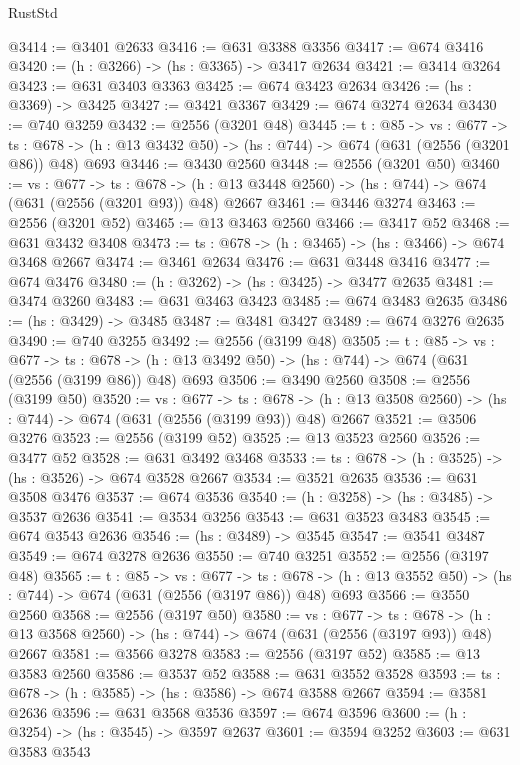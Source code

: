 \begin{lexlean}{RustStd}
\begin{coremodule}
@3414 := @3401 @2633
@3416 := @631 @3388 @3356
@3417 := @674 @3416
@3420 := (h : @3266) -> (hs : @3365) -> @3417 @2634
@3421 := @3414 @3264
@3423 := @631 @3403 @3363
@3425 := @674 @3423 @2634
@3426 := (hs : @3369) -> @3425
@3427 := @3421 @3367
@3429 := @674 @3274 @2634
@3430 := @740 @3259
@3432 := @2556 (@3201 @48)
@3445 := {t : @85} ->
  {vs : @677} ->
  {ts : @678} -> (h : @13 @3432 @50) -> (hs : @744) -> @674 (@631 (@2556 (@3201 @86)) @48) @693
@3446 := @3430 @2560
@3448 := @2556 (@3201 @50)
@3460 := {vs : @677} ->
  {ts : @678} -> (h : @13 @3448 @2560) -> (hs : @744) -> @674 (@631 (@2556 (@3201 @93)) @48) @2667
@3461 := @3446 @3274
@3463 := @2556 (@3201 @52)
@3465 := @13 @3463 @2560
@3466 := @3417 @52
@3468 := @631 @3432 @3408
@3473 := {ts : @678} -> (h : @3465) -> (hs : @3466) -> @674 @3468 @2667
@3474 := @3461 @2634
@3476 := @631 @3448 @3416
@3477 := @674 @3476
@3480 := (h : @3262) -> (hs : @3425) -> @3477 @2635
@3481 := @3474 @3260
@3483 := @631 @3463 @3423
@3485 := @674 @3483 @2635
@3486 := (hs : @3429) -> @3485
@3487 := @3481 @3427
@3489 := @674 @3276 @2635
@3490 := @740 @3255
@3492 := @2556 (@3199 @48)
@3505 := {t : @85} ->
  {vs : @677} ->
  {ts : @678} -> (h : @13 @3492 @50) -> (hs : @744) -> @674 (@631 (@2556 (@3199 @86)) @48) @693
@3506 := @3490 @2560
@3508 := @2556 (@3199 @50)
@3520 := {vs : @677} ->
  {ts : @678} -> (h : @13 @3508 @2560) -> (hs : @744) -> @674 (@631 (@2556 (@3199 @93)) @48) @2667
@3521 := @3506 @3276
@3523 := @2556 (@3199 @52)
@3525 := @13 @3523 @2560
@3526 := @3477 @52
@3528 := @631 @3492 @3468
@3533 := {ts : @678} -> (h : @3525) -> (hs : @3526) -> @674 @3528 @2667
@3534 := @3521 @2635
@3536 := @631 @3508 @3476
@3537 := @674 @3536
@3540 := (h : @3258) -> (hs : @3485) -> @3537 @2636
@3541 := @3534 @3256
@3543 := @631 @3523 @3483
@3545 := @674 @3543 @2636
@3546 := (hs : @3489) -> @3545
@3547 := @3541 @3487
@3549 := @674 @3278 @2636
@3550 := @740 @3251
@3552 := @2556 (@3197 @48)
@3565 := {t : @85} ->
  {vs : @677} ->
  {ts : @678} -> (h : @13 @3552 @50) -> (hs : @744) -> @674 (@631 (@2556 (@3197 @86)) @48) @693
@3566 := @3550 @2560
@3568 := @2556 (@3197 @50)
@3580 := {vs : @677} ->
  {ts : @678} -> (h : @13 @3568 @2560) -> (hs : @744) -> @674 (@631 (@2556 (@3197 @93)) @48) @2667
@3581 := @3566 @3278
@3583 := @2556 (@3197 @52)
@3585 := @13 @3583 @2560
@3586 := @3537 @52
@3588 := @631 @3552 @3528
@3593 := {ts : @678} -> (h : @3585) -> (hs : @3586) -> @674 @3588 @2667
@3594 := @3581 @2636
@3596 := @631 @3568 @3536
@3597 := @674 @3596
@3600 := (h : @3254) -> (hs : @3545) -> @3597 @2637
@3601 := @3594 @3252
@3603 := @631 @3583 @3543

\end{coremodule}
\end{lexlean}
